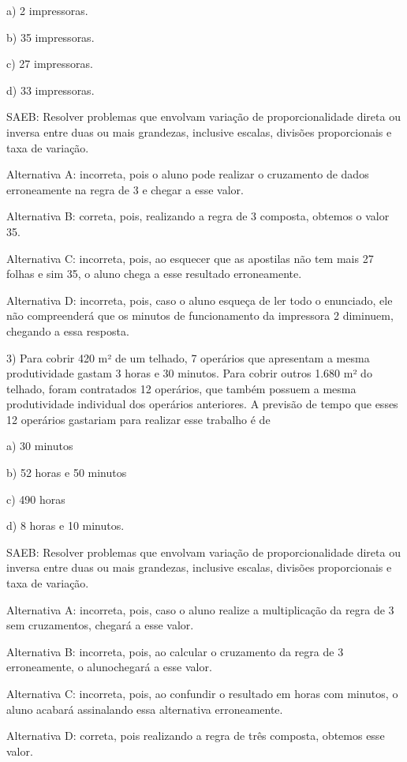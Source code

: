 a) 2 impressoras.

b) 35 impressoras.

c) 27 impressoras.

d) 33 impressoras.

SAEB: Resolver problemas que envolvam variação de proporcionalidade
direta ou inversa entre duas ou mais grandezas, inclusive escalas,
divisões proporcionais e taxa de variação.

Alternativa A: incorreta, pois o aluno pode realizar o cruzamento de
dados erroneamente na regra de 3 e chegar a esse valor.

Alternativa B: correta, pois, realizando a regra de 3 composta, obtemos
o valor 35.

Alternativa C: incorreta, pois, ao esquecer que as apostilas não tem
mais 27 folhas e sim 35, o aluno chega a esse resultado erroneamente.

Alternativa D: incorreta, pois, caso o aluno esqueça de ler todo o
enunciado, ele não compreenderá que os minutos de funcionamento da
impressora 2 diminuem, chegando a essa resposta.

3) Para cobrir 420 m² de um telhado, 7 operários que apresentam a mesma
produtividade gastam 3 horas e 30 minutos. Para cobrir outros 1.680 m²
do telhado, foram contratados 12 operários, que também possuem a mesma
produtividade individual dos operários anteriores. A previsão de tempo
que esses 12 operários gastariam para realizar esse trabalho é de

a) 30 minutos

b) 52 horas e 50 minutos

c) 490 horas

d) 8 horas e 10 minutos.

SAEB: Resolver problemas que envolvam variação de proporcionalidade
direta ou inversa entre duas ou mais grandezas, inclusive escalas,
divisões proporcionais e taxa de variação.

Alternativa A: incorreta, pois, caso o aluno realize a multiplicação da
regra de 3 sem cruzamentos, chegará a esse valor.

Alternativa B: incorreta, pois, ao calcular o cruzamento da regra de 3
erroneamente, o alunochegará a esse valor.

Alternativa C: incorreta, pois, ao confundir o resultado em horas com
minutos, o aluno acabará assinalando essa alternativa erroneamente.

Alternativa D: correta, pois realizando a regra de três composta,
obtemos esse valor.

